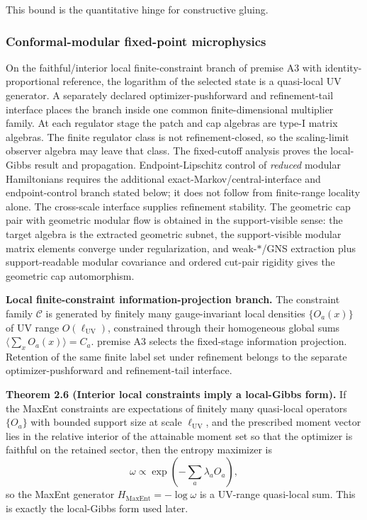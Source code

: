 This bound is the quantitative hinge for constructive gluing.

\subsubsection{Conformal-modular fixed-point microphysics}\label{27-conformal-modular-fixed-point-microphysics-cmfp}

On the faithful/interior local finite-constraint branch of premise A3 with identity-proportional reference, the logarithm of the selected state is a quasi-local UV generator. A separately declared optimizer-pushforward and refinement-tail interface places the branch inside one common finite-dimensional multiplier family. At each regulator stage the patch and cap algebras are type-I matrix algebras. The finite regulator class is not refinement-closed, so the scaling-limit observer algebra may leave that class. The fixed-cutoff analysis proves the local-Gibbs result and propagation. Endpoint-Lipschitz control of \emph{reduced} modular Hamiltonians requires the additional exact-Markov/central-interface and endpoint-control branch stated below; it does not follow from finite-range locality alone. The cross-scale interface supplies refinement stability. The geometric cap pair with geometric modular flow is obtained in the support-visible sense: the target algebra is the extracted geometric subnet, the support-visible modular matrix elements converge under regularization, and weak-\(*\)/GNS extraction plus support-readable modular covariance and ordered cut-pair rigidity gives the geometric cap automorphism.

\textbf{Local finite-constraint information-projection branch.} The constraint family \(\mathcal C\) is generated by finitely many gauge-invariant local densities \(\{O_a(x)\}\) of UV range \(O(\ell_{\mathrm{UV}})\), constrained through their homogeneous global sums \(\langle\sum_x O_a(x)\rangle = C_a\). premise A3 selects the fixed-stage information projection. Retention of the same finite label set under refinement belongs to the separate optimizer-pushforward and refinement-tail interface.

\textbf{Theorem 2.6 (Interior local constraints imply a local-Gibbs form).} If the MaxEnt constraints are expectations of finitely many quasi-local operators \(\{O_a\}\) with bounded support size at scale \(\ell_{\mathrm{UV}}\), and the prescribed moment vector lies in the relative interior of the attainable moment set so that the optimizer is faithful on the retained sector, then the entropy maximizer is
\[
\omega \propto \exp\!\left(-\sum_a \lambda_a O_a\right),
\]
so the MaxEnt generator \(H_{\mathrm{MaxEnt}}=-\log\omega\) is a UV-range quasi-local sum. This is exactly the local-Gibbs form used later.

